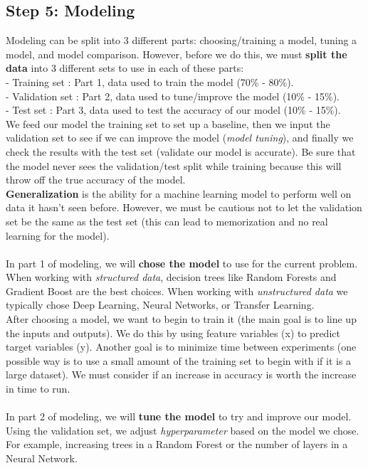 \documentclass[11pt, a4paper]{article}
\begin{document}
\begin{spacing}{1.1}
	\subsection{Step 5: Modeling}
	Modeling can be split into 3 different parts: choosing/training a model, tuning a model, and model comparison. However, before we do this, we must \textbf{split the data} into 3 different sets to use in each of these parts: \\
	\hspace*{2mm} - Training set : Part 1, data used to train the model (70\% - 80\%). \\
	\hspace*{2mm} - Validation set : Part 2, data used to tune/improve the model (10\% - 15\%). \\
	\hspace*{2mm} - Test set : Part 3, data used to test the accuracy of our model (10\% - 15\%). \vspace*{2mm} \\
	We feed our model the training set to set up a baseline, then we input the validation set to see if we can improve the model (\textit{model tuning}), and finally we check the results with the test set (validate our model is accurate). Be sure that the model never sees the validation/test split while training because this will throw off the true accuracy of the model. \vspace*{1mm} \\	
	\textbf{Generalization} is the ability for a machine learning model to perform well on data it hasn't seen before. However, we must be cautious not to let the validation set be the same as the test set (this can lead to memorization and no real learning for the model). \\~\\
	In part 1 of modeling, we will \textbf{chose the model} to use for the current problem. When working with \textit{structured data}, decision trees like Random Forests and Gradient Boost are the best choices. When working with \textit{unstructured data} we typically chose Deep Learning, Neural Networks, or Transfer Learning. \vspace*{1.5mm} \\ 
	After choosing a model, we want to begin to train it (the main goal is to line up the inputs and outputs). We do this by using feature variables (x) to predict target variables (y). Another goal is to minimize time between experiments (one possible way is to use a small amount of the training set to begin with if it is a large dataset). We must consider if an increase in accuracy is worth the increase in time to run. \\~\\
	In part 2 of modeling, we will \textbf{tune the model} to try and improve our model. Using the validation set, we adjust \textit{hyperparameter} based on the model we chose. For example, increasing trees in a Random Forest or the number of layers in a Neural Network. \newpage


\end{spacing}
\end{document}
